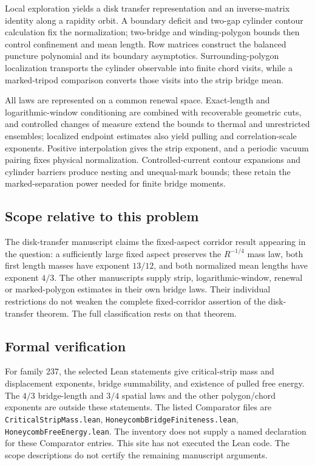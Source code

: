 \documentclass[11pt]{article}
\begin{document}
Local exploration yields a disk transfer representation and an inverse-matrix identity along a rapidity orbit. A boundary deficit and two-gap cylinder contour calculation fix the normalization; two-bridge and winding-polygon bounds then control confinement and mean length. Row matrices construct the balanced puncture polynomial and its boundary asymptotics. Surrounding-polygon localization transports the cylinder observable into finite chord visits, while a marked-tripod comparison converts those visits into the strip bridge mean.

All laws are represented on a common renewal space. Exact-length and logarithmic-window conditioning are combined with recoverable geometric cuts, and controlled changes of measure extend the bounds to thermal and unrestricted ensembles; localized endpoint estimates also yield pulling and correlation-scale exponents. Positive interpolation gives the strip exponent, and a periodic vacuum pairing fixes physical normalization. Controlled-current contour expansions and cylinder barriers produce nesting and unequal-mark bounds; these retain the marked-separation power needed for finite bridge moments.

\subsection{Scope relative to this problem}
The disk-transfer manuscript claims the fixed-aspect corridor result appearing in the question: a sufficiently large fixed aspect preserves the $R^{-1/4}$ mass law, both first length masses have exponent $13/12$, and both normalized mean lengths have exponent $4/3$. The other manuscripts supply strip, logarithmic-window, renewal or marked-polygon estimates in their own bridge laws. Their individual restrictions do not weaken the complete fixed-corridor assertion of the disk-transfer theorem. The full classification rests on that theorem.

\subsection{Formal verification}
For family 237, the selected Lean statements give critical-strip mass and displacement exponents, bridge summability, and existence of pulled free energy. The $4/3$ bridge-length and $3/4$ spatial laws and the other polygon/chord exponents are outside these statements. The listed Comparator files are \texttt{CriticalStripMass.lean}, \texttt{HoneycombBridgeFiniteness.lean}, \texttt{HoneycombFreeEnergy.lean}. The inventory does not supply a named declaration for these Comparator entries. This site has not executed the Lean code. The scope descriptions do not certify the remaining manuscript arguments.
\end{document}
